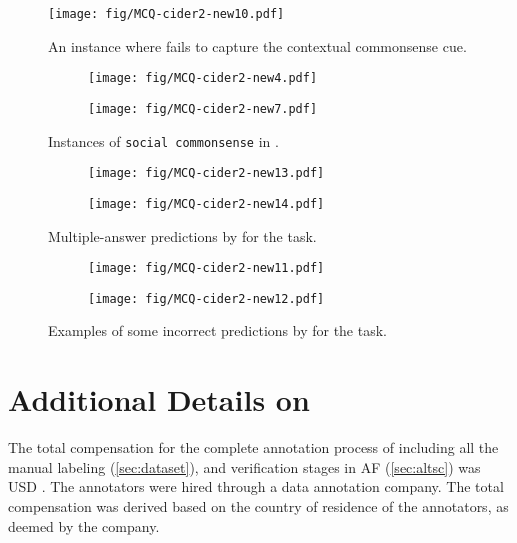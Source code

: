 \begin{figure}[ht]
        \texttt{[image: fig/MCQ-cider2-new10.pdf]}
        \caption{An instance where  fails to capture the contextual commonsense cue.}
        \label{fig:mcq10}
\end{figure}
\begin{figure}[t]
\begin{subfigure}[t]{\linewidth}
    \centering
        \texttt{[image: fig/MCQ-cider2-new4.pdf]}
        \caption{}
        \label{fig:mcq4}
\end{subfigure}

\begin{subfigure}[t]{\linewidth}
    \centering
        \texttt{[image: fig/MCQ-cider2-new7.pdf]}
        \caption{}
        \label{fig:mcq7}
\end{subfigure}
\caption{Instances of \texttt{social commonsense} in \dataset{}.}
\label{fig:social_csk_sup}
\end{figure}

\begin{figure}[ht]
\begin{subfigure}[t]{\linewidth}
    \centering
        \texttt{[image: fig/MCQ-cider2-new13.pdf]}
        \caption{}
        \label{fig:mcq13}
\end{subfigure}
\begin{subfigure}[t]{\linewidth}
    \centering
        \texttt{[image: fig/MCQ-cider2-new14.pdf]}
        \caption{}
        \label{fig:mcq14}
\end{subfigure}
\caption{Multiple-answer predictions by  for the \dataset{} task.}
\end{figure}

\begin{figure}[ht]
\begin{subfigure}[t]{\linewidth}
    \centering
        \texttt{[image: fig/MCQ-cider2-new11.pdf]}
        \label{fig:mcq11}
\end{subfigure}
\begin{subfigure}[t]{\linewidth}
    \centering
        \texttt{[image: fig/MCQ-cider2-new12.pdf]}
        \label{fig:mcq12}
\end{subfigure}
\caption{Examples of some incorrect predictions by  for the \dataset{} task.}
\label{fig:mcq11-12}
\end{figure}

\section{Additional Details on \dataset{}}
The total compensation for the complete annotation process of \dataset{} including all the manual labeling (\cref{sec:dataset}), and verification stages in AF (\cref{sec:altsc}) was USD . The annotators were hired through a data annotation company. The total compensation was derived based on the country of residence of the annotators, as deemed by the company.

